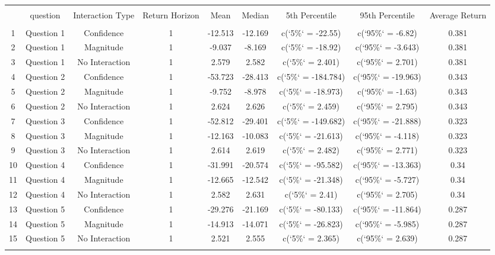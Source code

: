 
\begin{table}[!htbp] \centering 
  \caption{} 
  \label{} 
\begin{tabular}{@{\extracolsep{5pt}} ccccccccc} 
\\[-1.8ex]\hline 
\hline \\[-1.8ex] 
 & question & Interaction Type & Return Horizon & Mean & Median & 5th Percentile & 95th Percentile & Average Return \\ 
\hline \\[-1.8ex] 
1 & Question 1 & Confidence & 1 & -12.513 & -12.169 & c(`5\%` = -22.55) & c(`95\%` = -6.82) & 0.381 \\ 
2 & Question 1 & Magnitude & 1 & -9.037 & -8.169 & c(`5\%` = -18.92) & c(`95\%` = -3.643) & 0.381 \\ 
3 & Question 1 & No Interaction & 1 & 2.579 & 2.582 & c(`5\%` = 2.401) & c(`95\%` = 2.701) & 0.381 \\ 
4 & Question 2 & Confidence & 1 & -53.723 & -28.413 & c(`5\%` = -184.784) & c(`95\%` = -19.963) & 0.343 \\ 
5 & Question 2 & Magnitude & 1 & -9.752 & -8.978 & c(`5\%` = -18.973) & c(`95\%` = -1.63) & 0.343 \\ 
6 & Question 2 & No Interaction & 1 & 2.624 & 2.626 & c(`5\%` = 2.459) & c(`95\%` = 2.795) & 0.343 \\ 
7 & Question 3 & Confidence & 1 & -52.812 & -29.401 & c(`5\%` = -149.682) & c(`95\%` = -21.888) & 0.323 \\ 
8 & Question 3 & Magnitude & 1 & -12.163 & -10.083 & c(`5\%` = -21.613) & c(`95\%` = -4.118) & 0.323 \\ 
9 & Question 3 & No Interaction & 1 & 2.614 & 2.619 & c(`5\%` = 2.482) & c(`95\%` = 2.771) & 0.323 \\ 
10 & Question 4 & Confidence & 1 & -31.991 & -20.574 & c(`5\%` = -95.582) & c(`95\%` = -13.363) & 0.34 \\ 
11 & Question 4 & Magnitude & 1 & -12.665 & -12.542 & c(`5\%` = -21.348) & c(`95\%` = -5.727) & 0.34 \\ 
12 & Question 4 & No Interaction & 1 & 2.582 & 2.631 & c(`5\%` = 2.41) & c(`95\%` = 2.705) & 0.34 \\ 
13 & Question 5 & Confidence & 1 & -29.276 & -21.169 & c(`5\%` = -80.133) & c(`95\%` = -11.864) & 0.287 \\ 
14 & Question 5 & Magnitude & 1 & -14.913 & -14.071 & c(`5\%` = -26.823) & c(`95\%` = -5.985) & 0.287 \\ 
15 & Question 5 & No Interaction & 1 & 2.521 & 2.555 & c(`5\%` = 2.365) & c(`95\%` = 2.639) & 0.287 \\ 
\hline \\[-1.8ex] 
\end{tabular} 
\end{table} 
